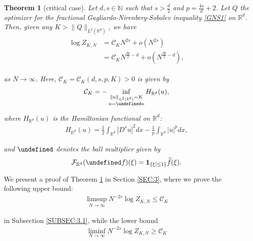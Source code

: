 \documentclass[letterpaper, 11pt,  reqno]{amsart}
\newtheorem{theorem}{Theorem} [section]
\newcommand{\noi}{\noindent}
\newcommand{\R}{\mathbb{R}}
\let\P= \undefined
\newcommand{\P}{\mathbf{P}}
\newcommand{\F}{\mathcal{F}}
\newcommand{\ind}{\mathbf 1}
\newcommand{\N}{\mathbb{N}}
\numberwithin{equation}{section}
\numberwithin{theorem}{section}
\newcommand{\CC}{\mathcal{C}}
\begin{document}
\begin{theorem}[critical case]\label{THM:1}
Let $d,  s \in \N$ such that   $s>\frac{d}{2}$
and  $p=\frac{4s}{d}+2$.
Let  $Q$ 
 the %
 optimizer for the fractional Gagliardo-Nirenberg-Sobolev inequality 
\eqref{GNS1}
on $\R^d$.
Then, given any   $K> \|Q\|_{L^2 (\R^d)}$, 
we have 
\begin{align}
\begin{split}
\log Z_{K, N} 
& = 
\CC_{K} N^{2s}+o(N^{2s})\\
& = 
\CC_{K} N^{\frac{dp}{2}-d}+o(N^{\frac{dp}{2}-d}),    
\end{split}
\label{A1}
\end{align}

\noi
as $N \to \infty$.
Here, 
 $\CC_K = \CC_{K}(d, s, p, K) > 0$ is 
given by 
\begin{align}
\CC_K= - \inf_{\substack{\|u\|_{L^2(\R^d)} = K\\ 
u = \P u}} H_{\R^d}(u), 
\label{A2}
\end{align}

\noi
where $H_{\R^d}(u)$ is the Hamiltonian functional on $\R^d$\textup{:}
\begin{align}
H_{\mathbb{R}^d} (u ) = \frac{1}{2} \int_{\R^d} |D^s u|^2 dx
- 
\frac{1}{p} \int_{\R^d} |u|^p dx,
\label{Hamil3}
\end{align}



\noi
and $\P$ denotes the ball multiplier given by 
\begin{align}
\F_{\R^d}(\P f)(\xi)=\ind_{\left\{\xi|\le 1\right\}}\widehat{f}(\xi).
\label{ball0}
\end{align}



\end{theorem}


\medskip

We present a proof of Theorem \ref{THM:1} in Section \ref{SEC:3}, 
where we prove the following upper bound:
\begin{align}
\limsup_{N\to \infty}N^{-2s} \log Z_{K, N}\le \CC_K
\label{A2a}
\end{align}

\noi
in Subsection \ref{SUBSEC:3.1}, 
while the lower bound 
\begin{align}
\liminf_{N\to \infty}N^{-2s} \log Z_{K, N}\ge \CC_K
\label{A2b}
\end{align}
\end{document}
